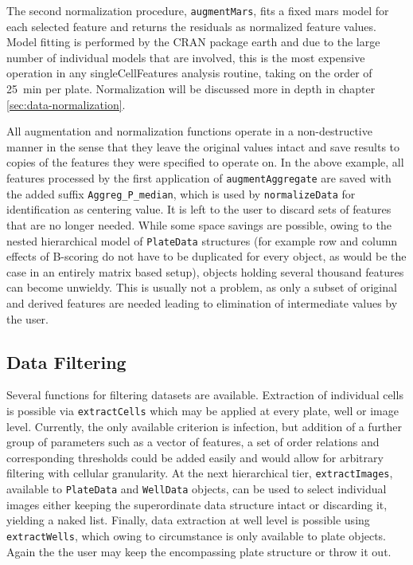 The second normalization procedure, \texttt{augmentMars}, fits a fixed \gls{mars} model for each selected feature and returns the residuals as normalized feature values. Model fitting is performed by the CRAN package earth \citep{Hastie2015} and due to the large number of individual models that are involved, this is the most expensive operation in any singleCellFeatures analysis routine, taking on the order of \SI{25}{\minute} per plate. Normalization will be discussed more in depth in chapter \ref{sec:data-normalization}.

All augmentation and normalization functions operate in a non-destructive manner in the sense that they leave the original values intact and save results to copies of the features they were specified to operate on. In the above example, all features processed by the first application of \texttt{augmentAggregate} are saved with the added suffix \texttt{Aggreg_P_median}, which is used by \texttt{normalizeData} for identification as centering value. It is left to the user to discard sets of features that are no longer needed. While some space savings are possible, owing to the nested hierarchical model of \texttt{PlateData} structures (for example row and column effects of B-scoring do not have to be duplicated for every object, as would be the case in an entirely matrix based setup), objects holding several thousand features can become unwieldy. This is usually not a problem, as only a subset of original and derived features are needed leading to elimination of intermediate values by the user.

\subsection{Data Filtering}
Several functions for filtering datasets are available. Extraction of individual cells is possible via \texttt{extractCells} which may be applied at every plate, well or image level. Currently, the only available criterion is infection, but addition of a further group of parameters such as a vector of features, a set of order relations and corresponding thresholds could be added easily and would allow for arbitrary filtering with cellular granularity. At the next hierarchical tier, \texttt{extractImages}, available to \texttt{PlateData} and \texttt{WellData} objects, can be used to select individual images either keeping the superordinate data structure intact or discarding it, yielding a naked list. Finally, data extraction at well level is possible using \texttt{extractWells}, which owing to circumstance is only available to plate objects. Again the the user may keep the encompassing plate structure or throw it out.

